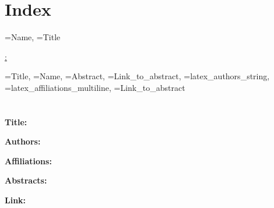 \documentclass[a4paper,12pt]{article}
\begin{document}

\section*{Index}

\begin{itemize}
  {\IndexName=Name,
  \IndexTitle=Title}
  {
    \edef\expandedname{\IndexName}
    
    \item \hyperref[abs:\expandedname]{\IndexName: \IndexTitle}
  }
\end{itemize}

\newpage

  {\Title=Title, 
  \Name=Name, 
  \Abstract=Abstract, 
  \Linktotheabstract=Link_to_abstract, 
  \Authors=latex_authors_string, 
  \Affiliations=latex_affiliations_multiline,
  \URL=Link_to_abstract}
  {
    \edef\expandedname{\Name}
    \section*{\expandedname}
    \label{abs:\expandedname}

    \textbf{Title:} \Title

    \textbf{Authors:} \Authors

    \textbf{Affiliations:} \Affiliations

    \textbf{Abstracts:} \Abstract

    \textbf{Link:} \href{\URL}{\URL}

    \newpage
  }
\end{document}
